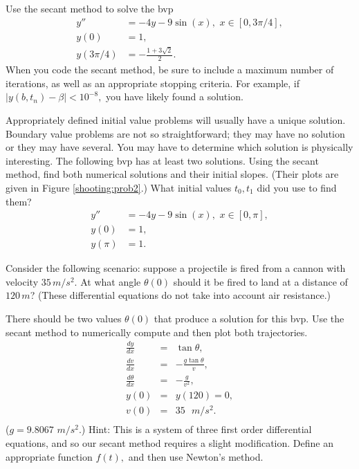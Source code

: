 \begin{problem} Use the secant method to solve the bvp
\begin{equation*}
\begin{split}
y'' &= -4y -9\sin(x), \,\, x \in [0,3\pi/4],\\
y(0) &= 1, \\
y(3\pi/4) &=-\frac{1+3\sqrt{2}}{2}.
\end{split}
\end{equation*}
When you code the secant method, be sure to include a maximum number of iterations, as well as an appropriate stopping criteria. For example, if $|y(b,t_n)-\beta|<10^{-8},$ you have likely found a solution. 
\end{problem}


\begin{problem} Appropriately defined initial value problems will usually have a unique solution. Boundary value problems are not so straightforward; they may have no solution or they may have several. You may have to determine which solution is physically interesting. The following bvp has at least two solutions. Using the secant method, find both numerical solutions and their initial slopes. (Their plots are given in Figure \eqref{shooting:prob2}.) What initial values $t_0, t_1$ did you use to find them?
\begin{equation*}
\begin{split}
y'' &= -4y -9\sin(x), \,\, x \in [0,\pi],\\
y(0) &= 1, \\
y(\pi) &=1.
\end{split}
\end{equation*}

\end{problem}


\begin{problem}
Consider the following scenario: suppose a projectile is fired from a cannon with velocity $35\, m/s^2.$ At what angle $\theta(0)$ should it be fired to land at a distance of $120\, m$? (These differential equations do not take into account air resistance.)

There should be two values $\theta(0)$ that produce a solution for this bvp. Use the secant method to numerically compute and then plot both trajectories.
\begin{eqnarray*}
\frac{dy}{dx} &=& \tan {\theta} ,\\
\frac{dv}{dx} &=& -\frac{g \tan{\theta}}{v } ,\\
\frac{d\theta}{dx} &=& -\frac{g}{v^2},\\
y(0)&=& y(120) = 0,\\
v(0) &=& 35 \text{ }m/s^2.\\
\end{eqnarray*}
($g = 9.8067$ $m/s^2.$) Hint: This is a system of three first order differential equations, and so our secant method requires a slight modification. Define an appropriate function $f(t),$ and then use Newton's method.
\end{problem}



